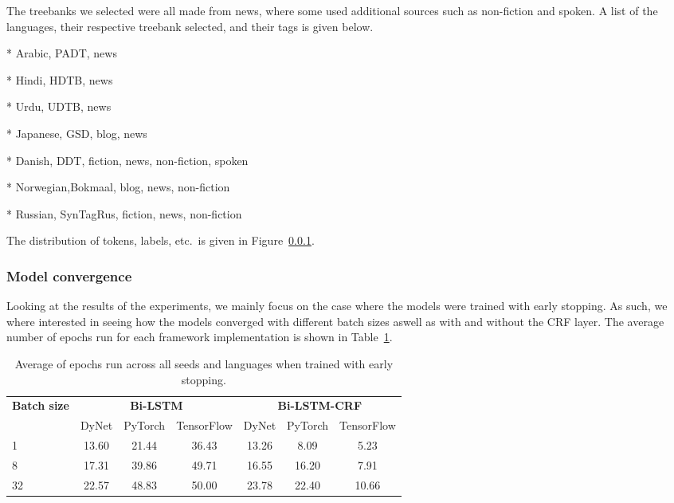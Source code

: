 The treebanks we selected were all made from news, where some used additional
sources such as non-fiction and spoken. A list of the languages, their
respective treebank selected, and their tags is given below.

* Arabic,   PADT, news

* Hindi,    HDTB, news

* Urdu,     UDTB, news

* Japanese, GSD, blog, news

* Danish,   DDT, fiction, news, non-fiction, spoken

* Norwegian,Bokmaal, blog, news, non-fiction

* Russian,  SynTagRus, fiction, news, non-fiction

The distribution of tokens, labels, etc.\ is given in Figure~\ref{}.

\subsubsection{Model convergence}

Looking at the results of the experiments, we mainly focus on the case where the
models were trained with early stopping. As such, we where
interested in seeing how the models converged with different batch sizes aswell
as with and without the CRF layer. The average number of epochs run for each
framework implementation is shown in Table~\ref{table:epochs-run-pos}.

\begin{table}[h!]
    \centering
    \begin{tabular}{l c c c|c c c}
        \toprule
        \multirow{2}{*}{\bfseries Batch size}     &
        \multicolumn{3}{c}{\bfseries Bi-LSTM}     &
        \multicolumn{3}{c}{\bfseries Bi-LSTM-CRF} \\
        \cmidrule(lr){2-7}
        & DyNet & PyTorch & TensorFlow
        & DyNet & PyTorch & TensorFlow \\
        \cmidrule(lr){1-7}
         1 & 13.60 & 21.44 & 36.43 & 13.26 &  8.09 &  5.23 \\
         8 & 17.31 & 39.86 & 49.71 & 16.55 & 16.20 &  7.91 \\
        32 & 22.57 & 48.83 & 50.00 & 23.78 & 22.40 & 10.66 \\
        \bottomrule
    \end{tabular}
    \caption{Average of epochs run across all seeds and languages when trained
        with early stopping.
    }\label{table:epochs-run-pos}
\end{table}

